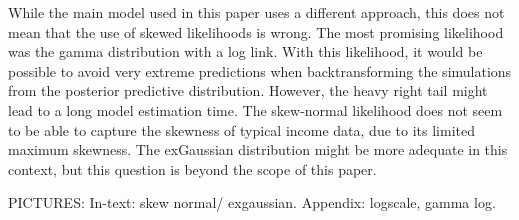 While the main model used in this paper uses a different approach, this does not mean that the use of skewed likelihoods is wrong.
The most promising likelihood was the gamma distribution with a log link.
With this likelihood, it would be possible to avoid very extreme predictions when backtransforming the simulations from the posterior predictive distribution.
However, the heavy right tail might lead to a long model estimation time.
The skew-normal likelihood does not seem to be able to capture the skewness of typical income data, due to its limited maximum skewness.
The exGaussian distribution might be more adequate in this context, but this question is beyond the scope of this paper.

PICTURES: In-text: skew normal/ exgaussian. Appendix: logscale, gamma log.
